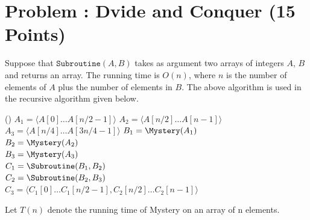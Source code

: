 \documentclass[12pt]{amsart}
\newcounter{pNum}
\newcommand{\problem}[2]{\addtocounter{pNum}{1}
\section*{Problem \arabic{pNum}: #1 (#2 Points)}}
\begin{document}
\newpage

\problem{Dvide and Conquer}{15}

Suppose that $\mathtt{Subroutine}(A,B)$ takes as argument two arrays of integers $A$, $B$ and returns an array. 
The running time is $O(n)$, where $n$ is the number of elements of $A$ plus the number of elements in $B$.
The above algorithm is used in the recursive \Mystery algorithm given below.


\begin{algorithm}[H]
\Fn(){}{
\SetAlgoLined
\SetNoFillComment
\DontPrintSemicolon
	$A_{1} = \langle A[0]\ldots A[n/2-1] \rangle$  
	$A_{2} = \langle A[n/2]\ldots A[n-1] \rangle$  
	$A_{3} = \langle A[n/4]\ldots A[3n/4-1] \rangle$  
	$B_1 = \Mystery(A_1)$ \\
	$B_2 = \Mystery(A_2)$ \\
	$B_3 = \Mystery(A_3)$ \\
	$C_1 = \Subroutine(B_1, B_2)$ \\
	$C_2 = \Subroutine(B_2, B_3)$ \\
	$C_3 = \langle C_1[0] \ldots C_1[n/2-1], C_{2}[n/2]\ldots C_{2}[n-1] \rangle$ 
	 
}
\end{algorithm}

Let $T(n)$ denote the running time of Mystery on an array of n elements.
\end{document}
